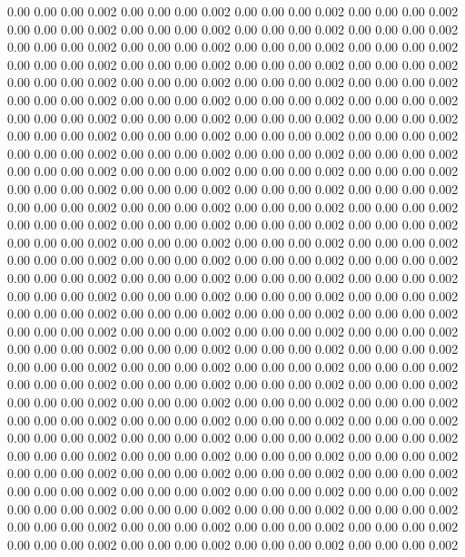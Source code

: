 0.00 0.00 0.00 0.002
0.00 0.00 0.00 0.002
0.00 0.00 0.00 0.002
0.00 0.00 0.00 0.002
0.00 0.00 0.00 0.002
0.00 0.00 0.00 0.002
0.00 0.00 0.00 0.002
0.00 0.00 0.00 0.002
0.00 0.00 0.00 0.002
0.00 0.00 0.00 0.002
0.00 0.00 0.00 0.002
0.00 0.00 0.00 0.002
0.00 0.00 0.00 0.002
0.00 0.00 0.00 0.002
0.00 0.00 0.00 0.002
0.00 0.00 0.00 0.002
0.00 0.00 0.00 0.002
0.00 0.00 0.00 0.002
0.00 0.00 0.00 0.002
0.00 0.00 0.00 0.002
0.00 0.00 0.00 0.002
0.00 0.00 0.00 0.002
0.00 0.00 0.00 0.002
0.00 0.00 0.00 0.002
0.00 0.00 0.00 0.002
0.00 0.00 0.00 0.002
0.00 0.00 0.00 0.002
0.00 0.00 0.00 0.002
0.00 0.00 0.00 0.002
0.00 0.00 0.00 0.002
0.00 0.00 0.00 0.002
0.00 0.00 0.00 0.002
0.00 0.00 0.00 0.002
0.00 0.00 0.00 0.002
0.00 0.00 0.00 0.002
0.00 0.00 0.00 0.002
0.00 0.00 0.00 0.002
0.00 0.00 0.00 0.002
0.00 0.00 0.00 0.002
0.00 0.00 0.00 0.002
0.00 0.00 0.00 0.002
0.00 0.00 0.00 0.002
0.00 0.00 0.00 0.002
0.00 0.00 0.00 0.002
0.00 0.00 0.00 0.002
0.00 0.00 0.00 0.002
0.00 0.00 0.00 0.002
0.00 0.00 0.00 0.002
0.00 0.00 0.00 0.002
0.00 0.00 0.00 0.002
0.00 0.00 0.00 0.002
0.00 0.00 0.00 0.002
0.00 0.00 0.00 0.002
0.00 0.00 0.00 0.002
0.00 0.00 0.00 0.002
0.00 0.00 0.00 0.002
0.00 0.00 0.00 0.002
0.00 0.00 0.00 0.002
0.00 0.00 0.00 0.002
0.00 0.00 0.00 0.002
0.00 0.00 0.00 0.002
0.00 0.00 0.00 0.002
0.00 0.00 0.00 0.002
0.00 0.00 0.00 0.002
0.00 0.00 0.00 0.002
0.00 0.00 0.00 0.002
0.00 0.00 0.00 0.002
0.00 0.00 0.00 0.002
0.00 0.00 0.00 0.002
0.00 0.00 0.00 0.002
0.00 0.00 0.00 0.002
0.00 0.00 0.00 0.002
0.00 0.00 0.00 0.002
0.00 0.00 0.00 0.002
0.00 0.00 0.00 0.002
0.00 0.00 0.00 0.002
0.00 0.00 0.00 0.002
0.00 0.00 0.00 0.002
0.00 0.00 0.00 0.002
0.00 0.00 0.00 0.002
0.00 0.00 0.00 0.002
0.00 0.00 0.00 0.002
0.00 0.00 0.00 0.002
0.00 0.00 0.00 0.002
0.00 0.00 0.00 0.002
0.00 0.00 0.00 0.002
0.00 0.00 0.00 0.002
0.00 0.00 0.00 0.002
0.00 0.00 0.00 0.002
0.00 0.00 0.00 0.002
0.00 0.00 0.00 0.002
0.00 0.00 0.00 0.002
0.00 0.00 0.00 0.002
0.00 0.00 0.00 0.002
0.00 0.00 0.00 0.002
0.00 0.00 0.00 0.002
0.00 0.00 0.00 0.002
0.00 0.00 0.00 0.002
0.00 0.00 0.00 0.002
0.00 0.00 0.00 0.002
0.00 0.00 0.00 0.002
0.00 0.00 0.00 0.002
0.00 0.00 0.00 0.002
0.00 0.00 0.00 0.002
0.00 0.00 0.00 0.002
0.00 0.00 0.00 0.002
0.00 0.00 0.00 0.002
0.00 0.00 0.00 0.002
0.00 0.00 0.00 0.002
0.00 0.00 0.00 0.002
0.00 0.00 0.00 0.002
0.00 0.00 0.00 0.002
0.00 0.00 0.00 0.002
0.00 0.00 0.00 0.002
0.00 0.00 0.00 0.002
0.00 0.00 0.00 0.002
0.00 0.00 0.00 0.002
0.00 0.00 0.00 0.002
0.00 0.00 0.00 0.002
0.00 0.00 0.00 0.002
0.00 0.00 0.00 0.002
0.00 0.00 0.00 0.002
0.00 0.00 0.00 0.002
0.00 0.00 0.00 0.002
